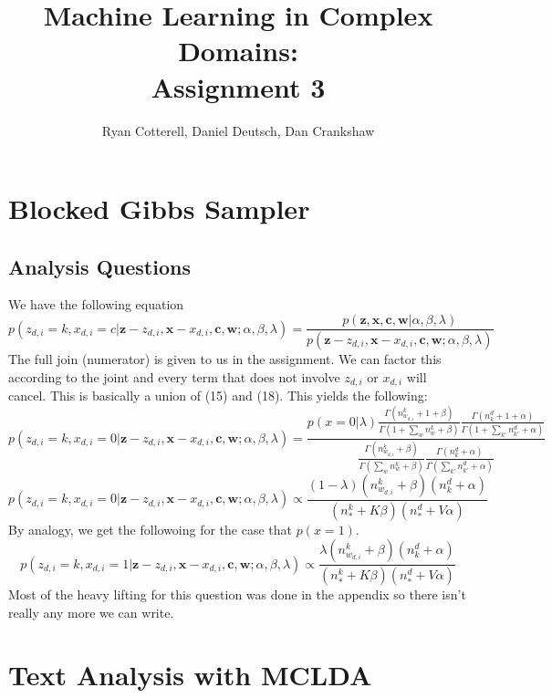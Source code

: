\documentclass[11pt,a4paper]{article}
\title{Machine Learning in Complex Domains:\\Assignment 3}
\author{Ryan Cotterell, Daniel Deutsch, Dan Crankshaw}
\date{}
\begin{document}
	\maketitle
	
	\setcounter{section}{3}
	\section{Blocked Gibbs Sampler}
	
	\subsection{Analysis Questions}


        We have the following equation
$$
p(z_{d,i} = k,x_{d,i} = c| \mathbf{z} - z_{d,i},\mathbf{x} - x_{d,i}, \mathbf{c},\mathbf{w} ; \alpha,\beta,\lambda) = \frac{p(\mathbf{z},\mathbf{x},\mathbf{c},\mathbf{w}|\alpha,\beta,\lambda)}{p(\mathbf{z} - z_{d,i},\mathbf{x} - x_{d,i},\mathbf{c},\mathbf{w} ; \alpha,\beta,\lambda)}
$$
The full join (numerator) is given to us in the assignment. We can factor this according to the joint and every term that does not involve $z_{d,i}$ or $x_{d,i}$ will cancel. This is basically a union of (15) and (18). This yields the following:
$$
p(z_{d,i} = k, x_{d,i} = 0| \mathbf{z} - z_{d,i},\mathbf{x} - x_{d,i}, \mathbf{c},\mathbf{w} ; \alpha,\beta,\lambda) = \frac{p(x=0|\lambda)
  \frac{\Gamma(n^k_{w_{d,i}} + 1 + \beta)}{\Gamma(1 + \sum_w n_w^k + \beta )} 
    \frac{\Gamma(n_k^d + 1 + \alpha)}{\Gamma(1 + \sum_{k'} n_{k'}^d + \alpha)}
    }
    {
    \frac{\Gamma(n_{w_{d,i}}^k + \beta)}{\Gamma(\sum_w n_w^k + \beta )}
    \frac{\Gamma(n_k^d + \alpha)}{\Gamma(\sum_{k'} n_{k'}^d + \alpha) } 
    }
$$
$$
p(z_{d,i} = k, x_{d,i} = 0| \mathbf{z} - z_{d,i},\mathbf{x} - x_{d,i}, \mathbf{c},\mathbf{w} ; \alpha,\beta,\lambda) \propto \frac{(1-\lambda) (n_{w_{d,i}}^k + \beta) (n_k^d + \alpha)}{(n_*^k + K\beta)(n_*^d + V\alpha)}
$$
By analogy, we get the followoing for the case that $p(x=1)$. 
$$
p(z_{d,i} = k, x_{d,i} = 1| \mathbf{z} - z_{d,i},\mathbf{x} - x_{d,i}, \mathbf{c},\mathbf{w} ; \alpha,\beta,\lambda) \propto \frac{\lambda (n_{w_{d,i}}^k + \beta) (n_k^d + \alpha)}{(n_*^k + K\beta)(n_*^d + V\alpha)}
$$
Most of the heavy lifting for this question was done in the appendix so there isn't really any more we can write. 

	
	\section{Text Analysis with MCLDA}
\end{document}
